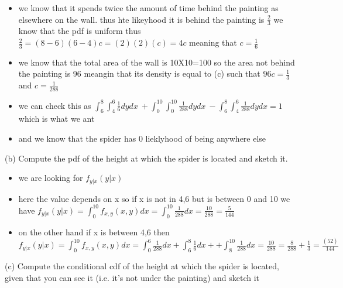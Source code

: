 \documentclass[10pt]{article}
\begin{document}
\begin{itemize}
    \item we know that it spends twice the amount of time behind the painting as elsewhere on the wall. thus hte likeyhood it is behind the painting is $\frac{2}{3}$ we know that the pdf is uniform thus $\frac{2}{3}=(8-6)(6-4)c=(2)(2)(c)=4c$ meaning that $c=\frac{1}{6}$
    \item we know that the total area of the wall is 10X10=100 so the area not behind the painting is 96 meangin that its density is equal to (c) such that $96c=\frac{1}{3}$ and $c=\frac{1}{288}$
    \item we can check this as $\int _6^8\int _4^6\frac{1}{6}dydx\:+\int _0^{10}\int _0^{10}\frac{1}{288}dydx\:-\int _6^8\int _4^6\frac{1}{288}dydx=1$ which is what we ant 
    \item and we know that the spider has 0 lieklyhood of being anywhere else 
\end{itemize}
(b) Compute the pdf of the height at which the spider is located and sketch it.
\begin{itemize}
    \item we are looking for $f_{y|x}(y|x)$ 
    \item here the value depends on x so if x is not in 4,6 but is between 0 and 10 we have $f_{y|x}(y|x)=\int_{0}^{10}f_{x,y}(x,y)dx=\int_{0}^{10}\frac{1}{288}dx=\frac{10}{288}=\frac{5}{144}$
    \item on the other hand if x is between 4,6 then $f_{y|x}(y|x)=\int_{0}^{10}f_{x,y}(x,y)dx=\int_{0}^{6}\frac{1}{288}dx+\int_{6}^{8}\frac{1}{6}dx++\int_{8}^{10}\frac{1}{288}dx=\frac{10}{288}=\frac{8}{288}+\frac{1}{3}=\frac{\left(52\right)}{144}$ 
\end{itemize}
(c) Compute the conditional cdf of the height at which the spider is located, given that
you can see it (i.e. it’s not under the painting) and sketch it
\end{document}
